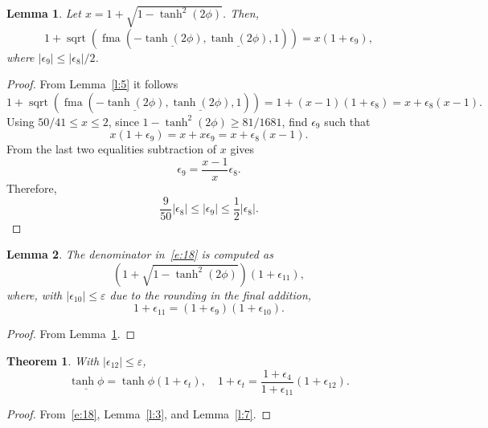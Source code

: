 \documentclass[a4paper,12pt,twoside]{article}
\newtheorem{thm}{Theorem}
\newtheorem{lem}{Lemma}
\begin{document}
\begin{lem}\label{l:6}
  Let $x=1+\sqrt{1-\tanh^2(2\phi)}$.  Then,
  \begin{displaymath}
    1+\mathop{\mathrm{sqrt}}(\mathop{\mathrm{fma}}(-\underline{\tanh(2\phi)},\underline{\tanh(2\phi)},1))=x(1+\epsilon_9),
  \end{displaymath}
  where $|\epsilon_9|\le|\epsilon_8|/2$.
\end{lem}
\begin{proof}
  From Lemma~\ref{l:5} it follows
  \begin{displaymath}
    1+\mathop{\mathrm{sqrt}}(\mathop{\mathrm{fma}}(-\underline{\tanh(2\phi)},\underline{\tanh(2\phi)},1))=1+(x-1)(1+\epsilon_8)=x+\epsilon_8(x-1).
  \end{displaymath}
  Using $50/41\le x\le 2$, since $1-\tanh^2(2\phi)\ge 81/1681$, find
  $\epsilon_9$ such that
  \begin{displaymath}
    x(1+\epsilon_9)=x+x\epsilon_9=x+\epsilon_8(x-1).
  \end{displaymath}
  From the last two equalities subtraction of $x$ gives
  \begin{displaymath}
    \epsilon_9=\frac{x-1}{x}\epsilon_8.
  \end{displaymath}
  Therefore,
  \begin{displaymath}
    \frac{9}{50}|\epsilon_8|\le|\epsilon_9|\le\frac{1}{2}|\epsilon_8|.
  \end{displaymath}
\end{proof}

\begin{lem}\label{l:7}
  The denominator in~\eqref{e:18} is computed as
  \begin{displaymath}
    (1+\sqrt{1-\tanh^2(2\phi)})(1+\epsilon_{11}),
  \end{displaymath}
  where, with $|\epsilon_{10}|\le\varepsilon$ due to the rounding in the
  final addition,
  \begin{displaymath}
    1+\epsilon_{11}=(1+\epsilon_9)(1+\epsilon_{10}).
  \end{displaymath}
\end{lem}
\begin{proof}
  From Lemma~\ref{l:6}.
\end{proof}

\begin{thm}\label{t:1}
  With $|\epsilon_{12}|\le\varepsilon$,
  \begin{equation}
    \underline{\tanh\phi}=\tanh\phi(1+\epsilon_t),\quad
    1+\epsilon_t=\frac{1+\epsilon_4}{1+\epsilon_{11}}(1+\epsilon_{12}).
    \label{e:23}
  \end{equation}
\end{thm}
\begin{proof}
  From~\eqref{e:18}, Lemma~\eqref{l:3}, and Lemma~\eqref{l:7}.
\end{proof}
\end{document}
